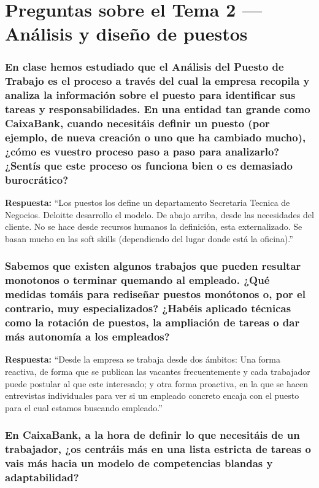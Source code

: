\section{Preguntas sobre el Tema 2 — Análisis y diseño de puestos}

\subsubsection*{En clase hemos estudiado que el Análisis del Puesto de Trabajo es el proceso a través del cual la empresa recopila y analiza la información sobre
 el puesto para identificar sus tareas y responsabilidades. En una entidad tan grande como CaixaBank, cuando necesitáis definir un puesto
(por ejemplo, de nueva creación o uno que ha cambiado mucho), ¿cómo es vuestro proceso paso a paso para analizarlo? ¿Sentís que este proceso os funciona
 bien o es demasiado burocrático?}

\textbf{Respuesta:}\newline
``Los puestos los define un departamento Secretaria Tecnica de Negocios. Deloitte desarrollo el modelo. De abajo arriba, desde las necesidades del cliente. No se hace desde recursos humanos la definición, esta externalizado. Se basan mucho en las soft skills (dependiendo del lugar donde está la oficina).''

\subsubsection*{Sabemos que existen algunos trabajos que pueden resultar monotonos o terminar quemando al empleado. ¿Qué medidas tomáis para rediseñar puestos monótonos o, por el contrario, muy especializados? ¿Habéis aplicado técnicas como la rotación de puestos, la ampliación de tareas o dar más autonomía a los empleados?}

\textbf{Respuesta:}\newline
``Desde la empresa se trabaja desde dos ámbitos: Una forma reactiva, de forma que se publican las vacantes frecuentemente y cada trabajador puede postular al que este interesado; y otra forma proactiva, en la que se hacen entrevistas individuales para ver si un empleado concreto encaja con el puesto para el cual estamos buscando empleado.''

\subsubsection*{En CaixaBank, a la hora de definir lo que necesitáis de un trabajador, ¿os centráis más en una lista estricta de tareas o vais más hacia un modelo de competencias blandas y adaptabilidad?}

